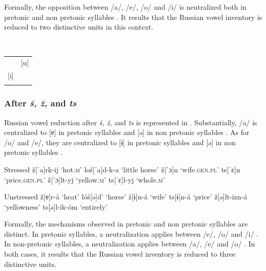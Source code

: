 \documentclass[output=paper,
modfonts,
newtxmath,
hidelinks,
]{langscibook}
\begin{document}
\noindent Formally, the opposition between /a/, /e/, /o/ and /i/ is neutralized both in pretonic and non pretonic syllables . It results that the Russian vowel inventory is reduced to two distinctive units in this context.

\label{5:6}\\\medskip
\begin{tabular}{|p{1.7cm}p{1.7cm}|}
\hline
&\multicolumn{1}{|c|}{[u]}\\\cline{2-2}
\multicolumn{1}{|c}{[i]}&\\
&\\\hline
\end{tabular}
\z

\subsubsection{After \textit{š, ž,} and \textit{ts}}\label{5:s2.1.3}

Russian vowel reduction after \textit{š, ž,} and \textit{ts} is represented in . Substantially, /a/ is centralized to [ɐ] in pretonic syllables  and [ə] in non pretonic syllables . As for /o/ and /e/, they are centralized to [ɨ] in pretonic syllables  and [ə] in non pretonic syllables .%

\ea\label{5:7}\begin{multicols}{2}
\begin{xlist}
\exi{} {Stressed}
\ex ž[ˈa]rk-ij \tabto{2.1cm}‘hot.\textsc{m}’\label{5:7a}
\ex loš[ˈa]d-k-a \tabto{2.1cm}‘little horse’\label{5:7b}
\ex ž[ˈɔ]n \tabto{2.1cm}‘wife.\textsc{gen.pl}’\label{5:7c}
\exi{} ts[ˈɛ]n \tabto{2.1cm}‘price.\textsc{gen.pl}’
\ex ž[ˈɔ]lt-yj \tabto{2.1cm}‘yellow.\textsc{m}’\label{5:7d}
\exi{} ts[ˈɛ]l-yj \tabto{2.1cm}‘whole.\textsc{m}’
\end{xlist}\columnbreak
\begin{xlist}
\exi{} {Unstressed}
\exi{} ž[ɐ]r-á \tabto{2.1cm}‘heat’
\exi{} lóš[ə]d’ \tabto{2.1cm}‘horse’
\exi{} ž[ɨ]n-á \tabto{2.1cm}‘wife’
\exi{} ts[ɨ]n-á \tabto{2.1cm}‘price’
\exi{} ž[ə]lt-izn-á \tabto{2.1cm}‘yellowness’
\exi{} ts[ə]l-ik-óm \tabto{2.1cm}‘entirely’
\end{xlist}
\end{multicols}
\z

\noindent Formally, the mechanisms observed in pretonic and non pretonic syllables are distinct. In pretonic syllables, a neutralization applies between /e/, /o/ and /i/ . In non-pretonic syllables, a neutralization applies between /a/, /e/ and /o/ . In both cases, it results that the Russian vowel inventory is reduced to three distinctive units.
\end{document}
